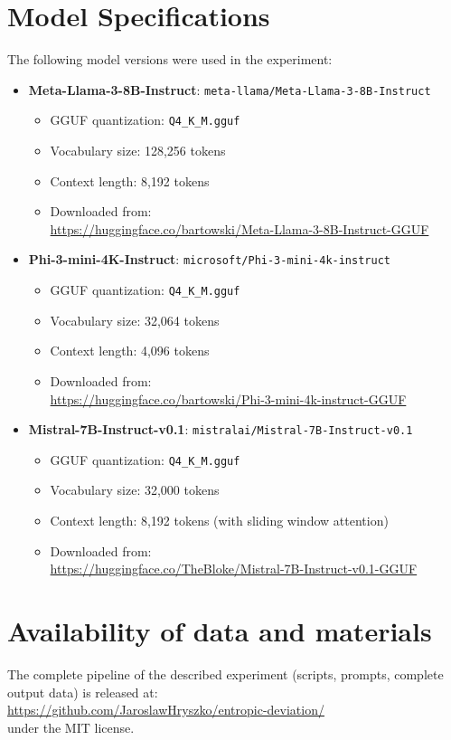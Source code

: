 \documentclass[12pt]{article}
\begin{document}
\section{Model Specifications}

The following model versions were used in the experiment:

\begin{itemize}[noitemsep]
\item \textbf{Meta-Llama-3-8B-Instruct}: \texttt{meta-llama/Meta-Llama-3-8B-Instruct}
  \begin{itemize}
  \item GGUF quantization: \texttt{Q4\_K\_M.gguf}
  \item Vocabulary size: 128,256 tokens
  \item Context length: 8,192 tokens
  \item Downloaded from: \\
  \url{https://huggingface.co/bartowski/Meta-Llama-3-8B-Instruct-GGUF}
  \end{itemize}

\item \textbf{Phi-3-mini-4K-Instruct}: \texttt{microsoft/Phi-3-mini-4k-instruct}
  \begin{itemize}
  \item GGUF quantization: \texttt{Q4\_K\_M.gguf}
  \item Vocabulary size: 32,064 tokens
  \item Context length: 4,096 tokens
  \item Downloaded from: \\
  \url{https://huggingface.co/bartowski/Phi-3-mini-4k-instruct-GGUF}
  \end{itemize}

\item \textbf{Mistral-7B-Instruct-v0.1}: \texttt{mistralai/Mistral-7B-Instruct-v0.1}
  \begin{itemize}
  \item GGUF quantization: \texttt{Q4\_K\_M.gguf}
  \item Vocabulary size: 32,000 tokens
  \item Context length: 8,192 tokens (with sliding window attention)
  \item Downloaded from: \\
  \url{https://huggingface.co/TheBloke/Mistral-7B-Instruct-v0.1-GGUF}
  \end{itemize}
\end{itemize}

\section{Availability of data and materials}

The complete pipeline of the described experiment (scripts, prompts, complete output data) is released at: \\
\url{https://github.com/JaroslawHryszko/entropic-deviation/} \\
under the MIT license.
\end{document}
